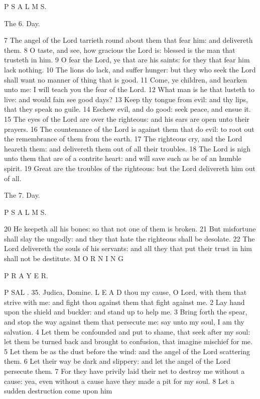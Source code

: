P S A L M S.

The 6. Day.

7 The angel of the Lord tarrieth round about them that fear him: and delivereth them. 8 O taste, and see, how gracious the Lord is: blessed is the man that trusteth in him. 9 O fear the Lord, ye that are his saints: for they that fear him lack nothing. 10 The lions do lack, and suffer hunger: but they who seek the Lord shall want no manner of thing that is good. 11 Come, ye children, and hearken unto me: I will teach you the fear of the Lord. 12 What man is he that lusteth to live: and would fain see good days? 13 Keep thy tongue from evil: and thy lips, that they speak no guile. 14 Eschew evil, and do good: seek peace, and ensue it. 15 The eyes of the Lord are over the righteous: and his ears are open unto their prayers. 16 The countenance of the Lord is against them that do evil: to root out the remembrance of them from the earth. 17 The righteous cry, and the Lord heareth them: and delivereth them out of all their troubles. 18 The Lord is nigh unto them that are of a contrite heart: and will save such as be of an humble spirit. 19 Great are the troubles of the righteous: but the Lord delivereth him out of all.

The 7. Day.

P S A L M S.

20 He keepeth all his bones: so that not one of them is broken. 21 But misfortune shall slay the ungodly: and they that hate the righteous shall be desolate. 22 The Lord delivereth the souls of his servants: and all they that put their trust in him shall not be destitute. M O R N I N G

P R A Y E R.

P SAL . 35. Judica, Domine. L E A D thou my cause, O Lord, with them that strive with me: and fight thou against them that fight against me. 2 Lay hand upon the shield and buckler: and stand up to help me. 3 Bring forth the spear, and stop the way against them that persecute me: say unto my soul, I am thy salvation. 4 Let them be confounded and put to shame, that seek after my soul: let them be turned back and brought to confusion, that imagine mischief for me. 5 Let them be as the dust before the wind: and the angel of the Lord scattering them. 6 Let their way be dark and slippery: and let the angel of the Lord persecute them. 7 For they have privily laid their net to destroy me without a cause: yea, even without a cause have they made a pit for my soul. 8 Let a sudden destruction come upon him

